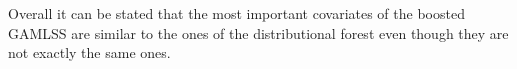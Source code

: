 \documentclass[american,foldmarks=false,noconfig]{uibklttr}
\begin{document}



Overall it can be stated that the most important covariates of the boosted 
GAMLSS are similar to the ones of the distributional forest even though they
are not exactly the same ones.

\bigskip

\end{document}
